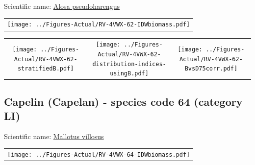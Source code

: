 \documentclass[12pt]{article}\usepackage[]{graphicx}\usepackage[]{color}
\begin{document}

Scientific name: \href{http://www.marinespecies.org/aphia.php?p=taxdetails\&id=158669}{Alosa pseudoharengus} \newline
\begin{minipage}{1.0\textwidth}
 \begin{tabular}{c}
\texttt{[image: ../Figures-Actual/RV-4VWX-62-IDWbiomass.pdf]} \\ 
\end{tabular} 
\end{minipage}
\newline

\vspace{1cm}
\begin{minipage}{1.0\textwidth}
 \begin{tabular}{ccc}
\texttt{[image: ../Figures-Actual/RV-4VWX-62-stratifiedB.pdf]} & 
\texttt{[image: ../Figures-Actual/RV-4VWX-62-distribution-indices-usingB.pdf]} & 
\texttt{[image: ../Figures-Actual/RV-4VWX-62-BvsD75corr.pdf]} \\ 
\end{tabular} 
\end{minipage}
\clearpage

\renewcommand\thefigure{\thesubsection\Alph{figure}}

\setcounter{figure}{0}

\hypertarget{sec:64}{%
\subsection{Capelin (Capelan) - species code 64 (category LI)}\label{sec:64}}

  


Scientific name: \href{http://www.marinespecies.org/aphia.php?p=taxdetails\&id=126735}{Mallotus villosus} \newline
\begin{minipage}{1.0\textwidth}
 \begin{tabular}{c}
\texttt{[image: ../Figures-Actual/RV-4VWX-64-IDWbiomass.pdf]} \\ 
\end{tabular} 
\end{minipage}
\newline
\end{document}
